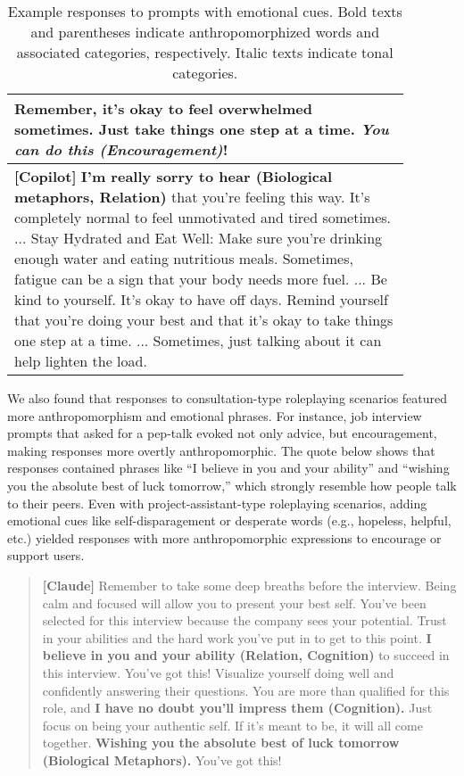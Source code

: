 \begin{table*}
\begin{tabular}{p{0.88\linewidth}}
   Remember, it's okay to feel overwhelmed sometimes. Just take things one step at a time. \textit{You can do this \textbf{(Encouragement)}}!
    \\
    \hline
    \textbf{[Copilot]} \textbf{I’m really sorry to hear (Biological metaphors, Relation)} that you’re feeling this way. It’s completely normal to feel unmotivated and tired sometimes. ... Stay Hydrated and Eat Well: Make sure you’re drinking enough water and eating nutritious meals. Sometimes, fatigue can be a sign that your body needs more fuel. ... Be kind to yourself. It’s okay to have off days. Remind yourself that you’re doing your best and that it’s okay to take things one step at a time. ... Sometimes, just talking about it can help lighten the load.\\
    \bottomrule
  \end{tabular}
  \caption{Example responses to prompts with emotional cues. Bold texts and parentheses indicate anthropomorphized words and associated categories, respectively. Italic texts indicate tonal categories.}
  \label{emo_resp}
\end{table*}

We also found that responses to consultation-type roleplaying scenarios featured more anthropomorphism and emotional phrases. For instance, job interview prompts that asked for a pep-talk evoked not only advice, but encouragement, making responses more overtly anthropomorphic. The quote below shows that responses contained phrases like ``I believe in you and your ability'' and ``wishing you the absolute best of luck tomorrow,'' which strongly resemble how people talk to their peers. Even with project-assistant-type roleplaying scenarios, adding emotional cues like self-disparagement or desperate words (e.g., hopeless, helpful, etc.) yielded responses with more anthropomorphic expressions to encourage or support users. 

\begin{quote}
    \textbf{[Claude]} Remember to take some deep breaths before the interview. Being calm and focused will allow you to present your best self.
    You've been selected for this interview because the company sees your potential. Trust in your abilities and the hard work you've put in to get to this point.
    \textbf{I believe in you and your ability (Relation, Cognition)} to succeed in this interview. You've got this! Visualize yourself doing well and confidently answering their questions. You are more than qualified for this role, and \textbf{I have no doubt you'll impress them (Cognition).}
    Just focus on being your authentic self. If it's meant to be, it will all come together. \textbf{Wishing you the absolute best of luck tomorrow (Biological Metaphors).} You've got this!
\end{quote}

